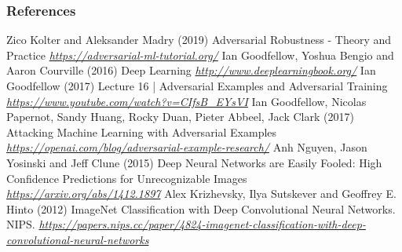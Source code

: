 
\begin{vbframe}
\frametitle{References}
\footnotesize{
\begin{thebibliography}{99}
 Zico Kolter and Aleksander Madry (2019)
\newblock Adversarial Robustness - Theory and Practice
\newblock \emph{\url{https://adversarial-ml-tutorial.org/}}
 Ian Goodfellow, Yoshua Bengio and Aaron Courville (2016)
\newblock Deep Learning
\newblock \emph{\url{http://www.deeplearningbook.org/}}
 Ian Goodfellow (2017)
\newblock Lecture 16 | Adversarial Examples and Adversarial Training
\newblock \emph{\url{https://www.youtube.com/watch?v=CIfsB_EYsVI}}
  Ian Goodfellow, Nicolas Papernot, Sandy Huang, Rocky Duan, Pieter Abbeel, Jack Clark (2017)
\newblock Attacking Machine Learning with Adversarial Examples
\newblock \emph{\url{https://openai.com/blog/adversarial-example-research/}}
 Anh Nguyen, Jason Yosinski and Jeff Clune (2015)
\newblock Deep Neural Networks are Easily Fooled: High Confidence Predictions for Unrecognizable Images
\newblock \emph{\url{https://arxiv.org/abs/1412.1897}}
 Alex Krizhevsky, Ilya Sutskever and Geoffrey E. Hinto (2012)
\newblock ImageNet Classification with Deep Convolutional Neural Networks. NIPS. 
\newblock \emph{\url{https://papers.nips.cc/paper/4824-imagenet-classification-with-deep-convolutional-neural-networks}}

\end{thebibliography}}
\end{vbframe}
